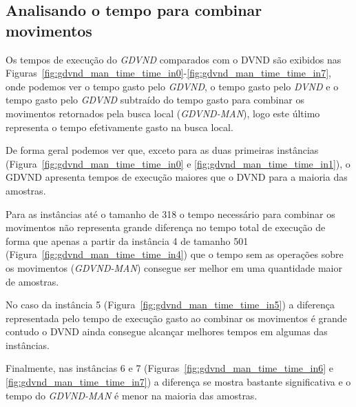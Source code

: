 \subsection{Analisando o tempo para combinar movimentos} \label{sec:gdvndTimeMan}

Os tempos de execução do \textit{GDVND} comparados com o DVND são exibidos nas Figuras~\ref{fig:gdvnd_man_time_time_in0}-\ref{fig:gdvnd_man_time_time_in7}, onde podemos ver o tempo gasto pelo \textit{GDVND}, o tempo gasto pelo \textit{DVND} e o tempo gasto pelo \textit{GDVND} subtraído do tempo gasto para combinar os movimentos retornados pela busca local (\textit{GDVND-MAN}), logo este último representa o tempo efetivamente gasto na busca local.



De forma geral podemos ver que, exceto para as duas primeiras instâncias (Figura~\ref{fig:gdvnd_man_time_time_in0} e \ref{fig:gdvnd_man_time_time_in1}), o GDVND apresenta tempos de execução maiores que o DVND para a maioria das amostras.



Para as instâncias até o tamanho de 318 o tempo necessário para combinar os movimentos não representa grande diferença no tempo total de execução de forma que apenas a partir da instância 4 de tamanho 501 (Figura~\ref{fig:gdvnd_man_time_time_in4}) que o tempo sem as operações sobre os movimentos (\textit{GDVND-MAN}) consegue ser melhor em uma quantidade maior de amostras.



No caso da instância 5 (Figura~\ref{fig:gdvnd_man_time_time_in5}) a diferença representada pelo tempo de execução gasto ao combinar os movimentos é grande contudo o DVND ainda consegue alcançar melhores tempos em algumas das instâncias.



Finalmente, nas instâncias 6 e 7 (Figuras~\ref{fig:gdvnd_man_time_time_in6} e \ref{fig:gdvnd_man_time_time_in7}) a diferença se mostra bastante significativa e o tempo do \textit{GDVND-MAN} é menor na maioria das amostras.

